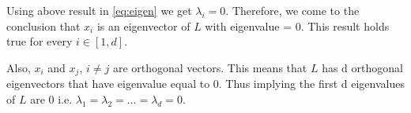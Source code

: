 \documentclass[12pt,a4paper]{article}
\begin{document}
Using above result in \eqref{eq:eigen} we get $\lambda_i = 0$. Therefore, we come to the conclusion that $x_i$ is an eigenvector of $L$ with eigenvalue = 0. This result holds true for every $i \in [1,d]$.

Also, $x_i$ and $x_j$, $i\neq j$ are orthogonal vectors. This means that $L$ has d orthogonal eigenvectors that have eigenvalue equal to 0. Thus implying the first d eigenvalues of $L$ are 0 i.e. $\lambda_1 = \lambda_2 = \hdots = \lambda_d = 0$.
\end{document}
